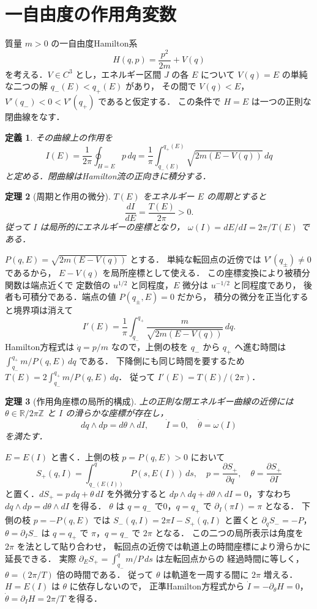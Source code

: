 \documentclass[a5paper,10pt,onecolumn]{jsarticle}
\makeatletter
\theoremstyle{mathnotetheorem}
\newtheorem{theorem}{定理}[section]
\newtheorem{definition}[theorem]{定義}
\renewcommand{\proofname}{証明}
\renewenvironment{proof}[1][\proofname]{%
  \par\pushQED{\qed}\normalfont\topsep4\p@\@plus2\p@\relax
  \trivlist\item[\hskip\labelsep\bfseries #1]\ignorespaces
}{\popQED\endtrivlist\@endpefalse}
\makeatother
\begin{document}
\section{一自由度の作用角変数}
質量 $m>0$ の一自由度Hamilton系
\[
 H(q,p)=\frac{p^2}{2m}+V(q)
\]
を考える．$V\in C^3$ とし，エネルギー区間 $J$ の各 $E$ について
$V(q)=E$ の単純な二つの解 $q_-(E)<q_+(E)$ があり，
その間で $V(q)<E$，$V'(q_-)<0<V'(q_+)$ であると仮定する．
この条件で $H=E$ は一つの正則な閉曲線をなす．
\begin{definition}
その曲線上の作用を
\[
 I(E)=\frac1{2\pi}\oint_{H=E}p\,dq
 =\frac1\pi\int_{q_-(E)}^{q_+(E)}
 \sqrt{2m(E-V(q))}\,dq
\]
と定める．閉曲線はHamilton流の正向きに積分する．
\end{definition}
\begin{theorem}[周期と作用の微分]
$T(E)$ をエネルギー $E$ の周期とすると
\[
 \frac{dI}{dE}=\frac{T(E)}{2\pi}>0.
\]
従って $I$ は局所的にエネルギーの座標となり，
$\omega(I)=dE/dI=2\pi/T(E)$ である．
\end{theorem}
\begin{proof}
$P(q,E)=\sqrt{2m(E-V(q))}$ とする．
単純な転回点の近傍では $V'(q_\pm)\ne0$ であるから，
$E-V(q)$ を局所座標として使える．
この座標変換により被積分関数は端点近くで
定数倍の $u^{1/2}$ と同程度，$E$ 微分は $u^{-1/2}$ と同程度であり，
後者も可積分である．端点の値 $P(q_\pm,E)=0$ だから，
積分の微分を正当化すると境界項は消えて
\[
 I'(E)=\frac1\pi\int_{q_-}^{q_+}
 \frac{m}{\sqrt{2m(E-V(q))}}\,dq.
\]
Hamilton方程式は $\dot q=p/m$ なので，上側の枝を
$q_-$ から $q_+$ へ進む時間は
$\int_{q_-}^{q_+}m/P(q,E)\,dq$ である．
下降側にも同じ時間を要するため
$T(E)=2\int_{q_-}^{q_+}m/P(q,E)\,dq$．
従って $I'(E)=T(E)/(2\pi)$．
\end{proof}
\begin{theorem}[作用角座標の局所的構成]
上の正則な閉エネルギー曲線の近傍には
$\theta\in\mathbb R/2\pi\mathbb Z$ と $I$ の滑らかな座標が存在し，
\[
 dq\wedge dp=d\theta\wedge dI,\qquad
 \dot I=0,\quad\dot\theta=\omega(I)
\]
を満たす．
\end{theorem}
\begin{proof}
$E=E(I)$ と書く．上側の枝 $p=P(q,E)>0$ において
\[
 S_+(q,I)=\int_{q_-(E(I))}^{q}P(s,E(I))\,ds,
 \quad p=\frac{\partial S_+}{\partial q},\quad
 \theta=\frac{\partial S_+}{\partial I}
\]
と置く．$dS_+=p\,dq+\theta\,dI$ を外微分すると
$dp\wedge dq+d\theta\wedge dI=0$，すなわち
$dq\wedge dp=d\theta\wedge dI$ を得る．
$\theta$ は $q=q_-$ で0，$q=q_+$ で
$\partial_I(\pi I)=\pi$ となる．
下側の枝 $p=-P(q,E)$ では
$S_-(q,I)=2\pi I-S_+(q,I)$ と置くと
$\partial_qS_-=-P$，$\theta=\partial_I S_-$ は
$q=q_+$ で $\pi$，$q=q_-$ で $2\pi$ となる．
この二つの局所表示は角度を $2\pi$ を法として貼り合わせ，
転回点の近傍では軌道上の時間座標により滑らかに延長できる．
実際 $\partial_E S_+=\int_{q_-}^q m/P\,ds$ は左転回点からの
経過時間に等しく，$\theta=(2\pi/T)$ 倍の時間である．
従って $\theta$ は軌道を一周する間に $2\pi$ 増える．
$H=E(I)$ は $\theta$ に依存しないので，
正準Hamilton方程式から
$\dot I=-\partial_\theta H=0$，
$\dot\theta=\partial_I H=2\pi/T$ を得る．
\end{proof}
\end{document}
